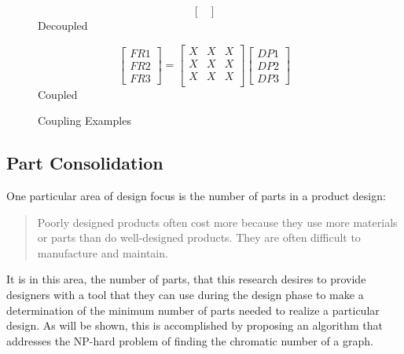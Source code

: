 \begin{figure}[h]
{\begin{minipage}{3in}
\begin{center}
\[\begin{bmatrix}
        \end{bmatrix}\]
        Decoupled
      \end{center}
    \end{minipage}
    \begin{minipage}{3in}
      \begin{center}
        \[\begin{bmatrix}
        FR1 \\ FR2 \\ FR3
        \end{bmatrix}=\begin{bmatrix}
        X & X & X \\
        X & X & X \\
        X & X & X \\
        \end{bmatrix}\begin{bmatrix}
          DP1 \\ DP2 \\ DP3
        \end{bmatrix}\]
        Coupled
      \end{center}
    \end{minipage}
  }
  \caption{Coupling Examples}
\end{figure}

\subsection{Part Consolidation}

One particular area of design focus is the number of parts in a product design:
\begin{quote}
  Poorly designed products often cost more because they use more materials or parts than do well-designed products.
  They are often difficult to manufacture and maintain.
\end{quote}
It is in this area, the number of parts, that this research desires to provide designers with a tool that they can
use during the design phase to make a determination of the minimum number of parts needed to realize a particular
design.  As will be shown, this is accomplished by proposing an algorithm that addresses the NP-hard problem of
finding the chromatic number of a graph.
